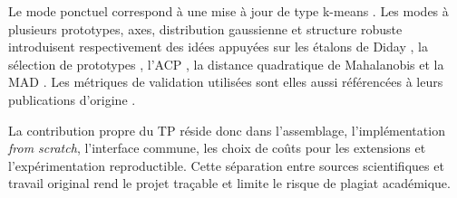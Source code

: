 \documentclass[12pt,a4paper]{article}
\begin{document}
Le mode ponctuel correspond à une mise à jour de type k-means \cite{macqueen1967,lloyd1982}. Les modes à plusieurs prototypes, axes, distribution gaussienne et structure robuste introduisent respectivement des idées appuyées sur les étalons de Diday \cite{diday1971}, la sélection de prototypes \cite{gonzalez1985,kaufman1990}, l'ACP \cite{jolliffe2016}, la distance quadratique de Mahalanobis \cite{mahalanobis1936} et la MAD \cite{rousseeuwcroux1993}. Les métriques de validation utilisées sont elles aussi référencées à leurs publications d'origine \cite{rousseeuw1987,hubert1985}.

La contribution propre du TP réside donc dans l'assemblage, l'implémentation \textit{from scratch}, l'interface commune, les choix de coûts pour les extensions et l'expérimentation reproductible. Cette séparation entre sources scientifiques et travail original rend le projet traçable et limite le risque de plagiat académique.
\end{document}
